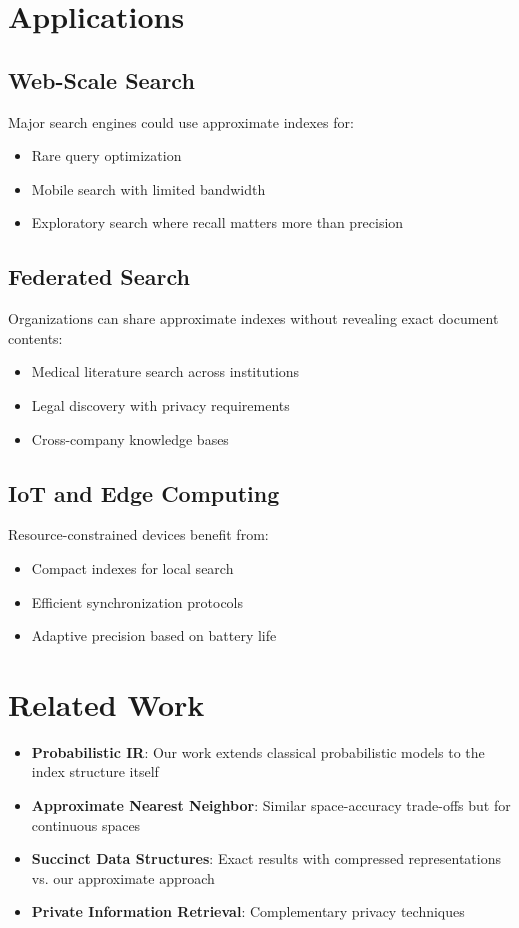 \documentclass[11pt,final,hidelinks]{article}
\begin{document}
\section{Applications}

\subsection{Web-Scale Search}

Major search engines could use approximate indexes for:
\begin{itemize}
    \item Rare query optimization
    \item Mobile search with limited bandwidth
    \item Exploratory search where recall matters more than precision
\end{itemize}

\subsection{Federated Search}

Organizations can share approximate indexes without revealing exact document contents:
\begin{itemize}
    \item Medical literature search across institutions
    \item Legal discovery with privacy requirements
    \item Cross-company knowledge bases
\end{itemize}

\subsection{IoT and Edge Computing}

Resource-constrained devices benefit from:
\begin{itemize}
    \item Compact indexes for local search
    \item Efficient synchronization protocols
    \item Adaptive precision based on battery life
\end{itemize}

\section{Related Work}

\begin{itemize}
    \item \textbf{Probabilistic IR}: Our work extends classical probabilistic models to the index structure itself
    \item \textbf{Approximate Nearest Neighbor}: Similar space-accuracy trade-offs but for continuous spaces
    \item \textbf{Succinct Data Structures}: Exact results with compressed representations vs. our approximate approach
    \item \textbf{Private Information Retrieval}: Complementary privacy techniques
\end{itemize}
\end{document}
